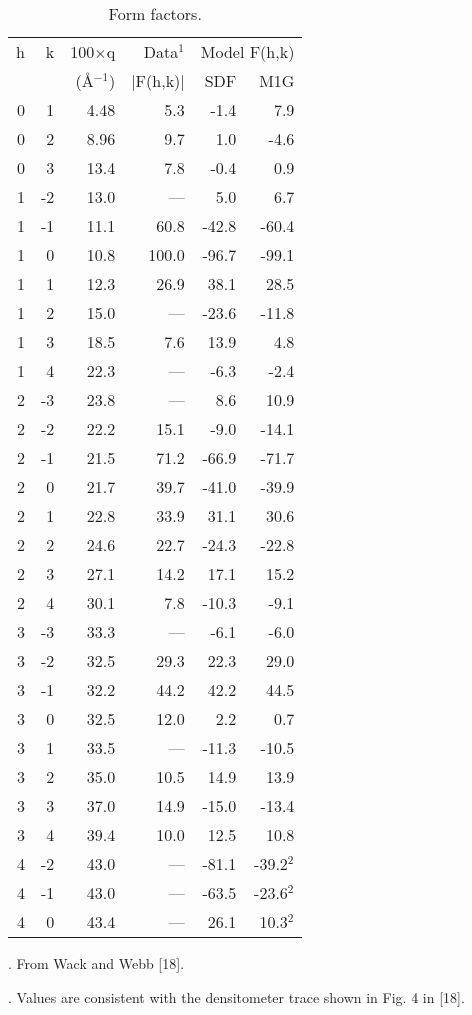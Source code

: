 \begin{table}
\caption{Form factors.
\label{formfactor}}
\vspace{6pt}
\begin{tabular}{rrrrrr} 
h & k & 100$\times$q & Data$^{1}$ &
        \multicolumn{2}{c}{Model F(h,k)} \\ \cline{5-6}
& & (\AA$^{-1}$) & $|$F(h,k)$|$ & SDF & M1G \\ \hline
0 &  1 & 4.48  &  5.3  &  -1.4  &  7.9  \\
0 &  2 & 8.96  & 9.7  &  1.0  &  -4.6 \\
0 &  3 & 13.4  &  7.8  &  -0.4   &  0.9 \\
1 &  -2 & 13.0  &  ---  &  5.0  &  6.7   \\
1 &  -1 & 11.1  &  60.8  &  -42.8  &  -60.4 \\
1 &   0 & 10.8  &  100.0  &  -96.7  &  -99.1 \\
1 &   1 & 12.3  &  26.9  &  38.1  &  28.5 \\
1 &   2 & 15.0  &  ---  &  -23.6  &  -11.8 \\
1 &   3 & 18.5  &  7.6  &  13.9  &  4.8 \\
1 &   4 & 22.3  &  ---  &  -6.3  &  -2.4 \\
2 &  -3 & 23.8  &  ---  &  8.6  &  10.9 \\
2 &  -2 & 22.2  &  15.1  &  -9.0  &  -14.1 \\
2 &  -1 & 21.5  &  71.2  &  -66.9  &  -71.7 \\
2 &   0 & 21.7  &  39.7  &  -41.0  &  -39.9 \\
2 &   1 & 22.8  &  33.9  &  31.1  &  30.6 \\
2 &   2 & 24.6  &  22.7  &  -24.3  &  -22.8 \\
2 &   3 & 27.1  &  14.2  &  17.1  &  15.2 \\
2 &   4 & 30.1  &  7.8  &  -10.3  &  -9.1 \\
3 &  -3 & 33.3  &  ---  &  -6.1  &  -6.0 \\
3 &  -2 & 32.5  &  29.3  &  22.3  &  29.0 \\
3 &  -1 & 32.2  &  44.2  &  42.2  &  44.5 \\
3 &   0 & 32.5  &  12.0    &  2.2  &  0.7   \\
3 &   1 & 33.5  &  ---  &  -11.3  &  -10.5 \\
3 &   2 & 35.0  &  10.5  &  14.9  &  13.9 \\
3 &   3 & 37.0  &  14.9  &  -15.0  &  -13.4 \\
3 &   4 & 39.4  &  10.0  &  12.5  &  10.8 \\
4 &  -2 & 43.0  &  ---  &  -81.1  &  -39.2$^{2}$ \\
4 &  -1 & 43.0  &  ---  &  -63.5  &  -23.6$^{2}$ \\
4 &   0 & 43.4  &  ---  &  26.1  &  10.3$^{2}$ \\
\end{tabular}
{\small
{}. From Wack and Webb [18].

. Values are consistent with the densitometer trace shown in 
        Fig. 4 in [18].
}
\end{table}


